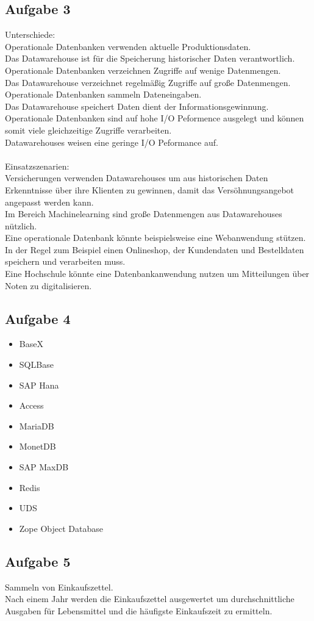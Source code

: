 \documentclass{article}
\begin{document}
	\subsection*{Aufgabe 3}
	Unterschiede: \\
	Operationale Datenbanken verwenden aktuelle Produktionsdaten. \\
	Das Datawarehouse ist für die Speicherung historischer Daten verantwortlich. \\
	Operationale Datenbanken verzeichnen Zugriffe auf wenige Datenmengen. \\
	Das Datawarehouse verzeichnet regelmäßig Zugriffe auf große Datenmengen. \\
	Operationale Datenbanken sammeln Dateneingaben. \\
	Das Datawarehouse speichert Daten dient der Informationsgewinnung. \\
	Operationale Datenbanken sind auf hohe I/O Peformence ausgelegt und können somit viele gleichzeitige Zugriffe verarbeiten. \\
	Datawarehouses weisen eine geringe I/O Peformance auf. \\ \\
	Einsatzszenarien: \\
	Versicherungen verwenden Datawarehouses um aus historischen Daten Erkenntnisse über ihre Klienten zu gewinnen, damit das Versöhnungsangebot angepasst werden kann. \\
	Im Bereich Machinelearning sind große Datenmengen aus Datawarehouses nützlich. \\
	Eine operationale Datenbank könnte beispielsweise eine Webanwendung stützen. In der Regel zum Beispiel einen Onlineshop, der Kundendaten und Bestelldaten speichern und verarbeiten muss. \\
	Eine Hochschule könnte eine Datenbankanwendung nutzen um Mitteilungen über Noten zu digitalisieren.
	\subsection*{Aufgabe 4}
	\begin{itemize}
		\item BaseX
		\item SQLBase
		\item SAP Hana
		\item Access
		\item MariaDB
		\item MonetDB
		\item SAP MaxDB
		\item Redis
		\item UDS
		\item Zope Object Database
	\end{itemize}
	\subsection*{Aufgabe 5}
	Sammeln von Einkaufszettel. \\
	Nach einem Jahr werden die Einkaufszettel ausgewertet um durchschnittliche Ausgaben für Lebensmittel und die häufigste Einkaufszeit zu ermitteln.
\end{document}
